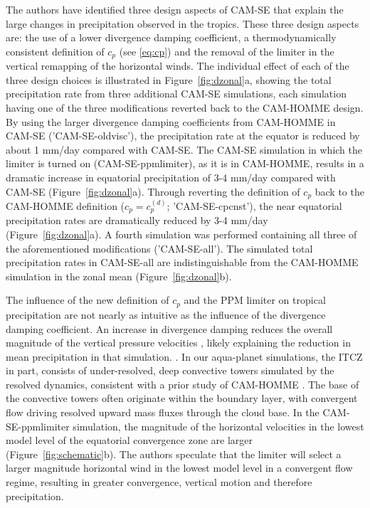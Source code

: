 \documentclass{agujournal}
\begin{document}
The authors have identified three design aspects of CAM-SE that explain the large changes in precipitation observed in the tropics. These three design aspects are: the use of a lower divergence damping coefficient, a thermodynamically consistent definition of $c_p$ (see \eqref{eq:cp}) and the removal of the limiter in the vertical remapping of the horizontal winds. The individual effect of each of the three design choices is illustrated in Figure~\ref{fig:dzonal}a, showing the total precipitation rate from three additional CAM-SE simulations, each simulation having one of the three modifications reverted back to the CAM-HOMME design. By using the larger divergence damping coefficients from CAM-HOMME in CAM-SE ('CAM-SE-oldvisc'), the precipitation rate at the equator is reduced by about 1 mm/day compared with CAM-SE. The CAM-SE simulation in which the limiter is turned on (CAM-SE-ppmlimiter), as it is in CAM-HOMME, results in a dramatic increase in equatorial precipitation of 3-4 mm/day compared with CAM-SE (Figure~\ref{fig:dzonal}a). Through reverting the definition of $c_p$ back to the CAM-HOMME definition ($c_p = c_p^{(d)}$; 'CAM-SE-cpcnst'), the near equatorial precipitation rates are dramatically reduced by 3-4 mm/day (Figure~\ref{fig:dzonal}a). A fourth simulation was performed containing all three of the aforementioned modifications ('CAM-SE-all'). The simulated total precipitation rates in CAM-SE-all are indistinguishable from the CAM-HOMME simulation in the zonal mean (Figure~\ref{fig:dzonal}b).

The influence of the new definition of $c_p$ and the PPM limiter on tropical precipitation are not nearly as intuitive as the influence of the divergence damping coefficient. An increase in divergence damping reduces the overall magnitude of the vertical pressure velocities {}, likely explaining the reduction in mean precipitation in that simulation. {}. In our aqua-planet simulations, the ITCZ in part, consists of under-resolved, deep convective towers simulated by the resolved dynamics, consistent with a prior study of CAM-HOMME \citep{HR2017JCLIM}. The base of the convective towers often originate within the boundary layer, with convergent flow driving resolved upward mass fluxes through the cloud base. In the CAM-SE-ppmlimiter simulation, the magnitude of the horizontal velocities in the lowest model level of the equatorial convergence zone are larger (Figure~\ref{fig:schematic}b). The authors speculate that the limiter will select a larger magnitude horizontal wind in the lowest model level in a convergent flow regime, resulting in greater convergence, vertical motion and therefore precipitation.
\end{document}
